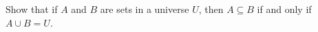 \documentclass{exam}
\begin{document}
\begin{questions}


\question Show that if $A$ and $B$ are sets in a universe $U$, then $A \subseteq B$ if and only if $A \cup B = U$.

\vspace{9in}


\end{questions}
\end{document}
